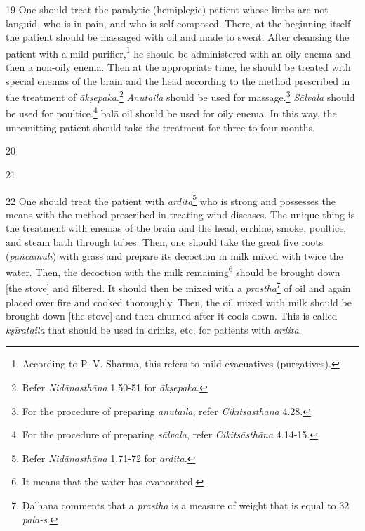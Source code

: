\begin{translation}
    \item[19]
    One should treat the paralytic (hemiplegic) patient whose limbs are not languid, who is in pain, and who is self-composed. There, at the beginning itself the patient should be massaged with oil and made to sweat. After cleansing the patient with a mild purifier,\footnote{According to P. V. Sharma, this refers to mild evacuatives (purgatives).} he should be administered with an oily enema and then a non-oily enema. Then at the appropriate time, he should be treated with special enemas of the brain and the head according to the method prescribed in the treatment of \textit{ākṣepaka}.\footnote{Refer \textit{Nidānasthāna} 1.50-51 for \textit{ākṣepaka}.} \textit{Anutaila} should be used for massage.\footnote{For the procedure of preparing \textit{anutaila}, refer \textit{Cikitsāsthāna} 4.28.} \textit{Sālvala} should be used for poultice.\footnote{For the procedure of preparing \textit{sālvala}, refer \textit{Cikitsāsthāna} 4.14-15.} \gls{balā} oil should be used for oily enema. In this way, the unremitting patient should take the treatment for three to four months.

    \item[20]

    \item[21] 

    \item[22]
    One should treat the patient with \textit{ardita}\footnote{Refer \textit{Nidānasthāna} 1.71-72 for \textit{ardita}.} who is strong and possesses the means with the method prescribed in treating wind diseases. The unique thing is the treatment with enemas of the brain and the head, errhine, smoke, poultice, and steam bath through tubes. Then, one should take the great five roots (\textit{pañcamūlī}) with grass and prepare its decoction in milk mixed with twice the water. Then, the decoction with the milk remaining\footnote{It means that the water has evaporated.} should be brought down [the stove] and filtered. It should then be mixed with a \textit{prastha}\footnote{Ḍalhana comments \citep[425]{vulgate} that a \textit{prastha} is a measure of weight that is equal to 32 \textit{pala-s}.} of oil and again placed over fire and cooked thoroughly. Then, the oil mixed with milk should be brought down [the stove] and then churned after it cools down. This is called \textit{kṣīrataila} that should be used in drinks, etc. for patients with \textit{ardita}.  


\end{translation}
